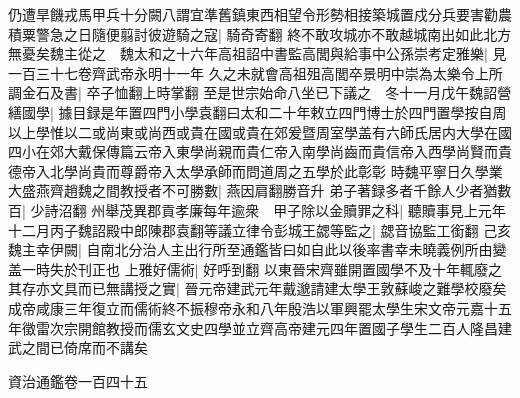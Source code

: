 仍遭旱饑戎馬甲兵十分闕八謂宜準舊鎮東西相望令形勢相接築城置戍分兵要害勸農積粟警急之日隨便翦討彼遊騎之寇|{
	騎奇寄翻}
終不敢攻城亦不敢越城南出如此北方無憂矣魏主從之　魏太和之十六年高祖詔中書監高閭與給事中公孫崇考定雅樂|{
	見一百三十七卷齊武帝永明十一年}
久之未就會高祖殂高閭卒景明中崇為太樂令上所調金石及書|{
	卒子恤翻上時掌翻}
至是世宗始命八坐已下議之　冬十一月戊午魏詔營繕國學|{
	據目録是年置四門小學袁翻曰太和二十年敕立四門博士於四門置學按自周以上學惟以二或尚東或尚西或貴在國或貴在郊爰暨周室學盖有六師氏居内大學在國四小在郊大戴保傳篇云帝入東學尚親而貴仁帝入南學尚齒而貴信帝入西學尚賢而貴德帝入北學尚貴而尊爵帝入太學承師而問道周之五學於此彰彰}
時魏平寧日久學業大盛燕齊趙魏之間教授者不可勝數|{
	燕因肩翻勝音升}
弟子著録多者千餘人少者猶數百|{
	少詩沼翻}
州舉茂異郡貢孝廉每年逾衆　甲子除以金贖罪之科|{
	聽贖事見上元年}
十二月丙子魏詔殿中郎陳郡袁翻等議立律令彭城王勰等監之|{
	勰音協監工銜翻}
己亥魏主幸伊闕|{
	自南北分治人主出行所至通鑑皆曰如自此以後率書幸未曉義例所由變盖一時失於刊正也}
上雅好儒術|{
	好呼到翻}
以東晉宋齊雖開置國學不及十年輒廢之其存亦文具而已無講授之實|{
	晉元帝建武元年戴邈請建太學王敦蘇峻之難學校廢矣成帝咸康三年復立而儒術終不振穆帝永和八年殷浩以軍興罷太學生宋文帝元嘉十五年徵雷次宗開館教授而儒玄文史四學並立齊高帝建元四年置國子學生二百人隆昌建武之間已倚席而不講矣}


資治通鑑卷一百四十五
